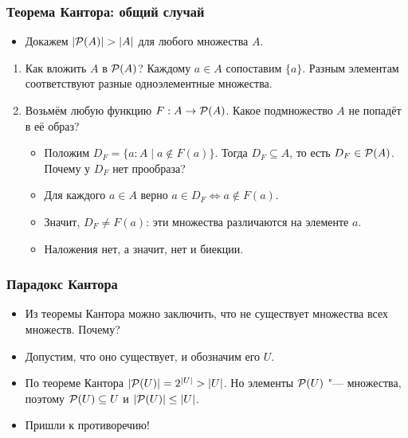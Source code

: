 \documentclass[10pt]{beamer}
\begin{document}
\begin{frame}
    \frametitle{Теорема Кантора: общий случай}
    \begin{itemize}
        \item Докажем $|\pow{A}|>|A|$ для любого множества $A$.
    \end{itemize}
    \begin{enumerate}
        \pause
        \item Как вложить $A$ в $\mathcal{P}({A})$? \pause Каждому $a\in A$ сопоставим $\{a\}$. Разным элементам соответствуют разные одноэлементные множества.
        \pause
        \item Возьмём любую функцию $F:A\to\mathcal{P}({A})$. Какое подмножество $A$ не попадёт в её образ?
        \begin{itemize}
            \item<5-> Положим $D_F=\{a:A\mid a\notin F(a)\}$. Тогда $D_F\subseteq A$, то есть $D_F\in\mathcal{P}({A})$. Почему у $D_F$ нет прообраза?
            \item<6-> Для каждого $a\in A$ верно $a\in D_F\iff a\notin F(a)$.
            \item<7-> Значит, $D_F\ne F(a)$: эти множества различаются на элементе $a$.
            \item<7-> Наложения нет, а значит, нет и биекции.
        \end{itemize}
    \end{enumerate}
\end{frame}

\begin{frame}
    \frametitle{Парадокс Кантора}
    \begin{itemize}
        \item Из теоремы Кантора можно заключить, что не существует множества всех множеств. Почему?
        \pause
        \item Допустим, что оно существует, и обозначим его $U$.
        \item По теореме Кантора $|\mathcal{P}({U})|=2^{|U|}>|U|$. Но элементы $\mathcal{P}({U})$ "--- множества, поэтому \pause $\mathcal{P}({U}) \subseteq U$ и \pause $|\mathcal{P}({U})| \leq |U|$.
        \item Пришли к противоречию!
    \end{itemize}
\end{frame}
\end{document}
